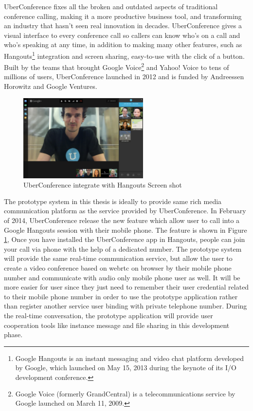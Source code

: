 \par UberConference fixes all the broken and outdated aspects of traditional conference calling, making it a more productive business tool, and transforming an industry that hasn't seen real innovation in decades. UberConference gives a visual interface to every conference call so callers can know who's on a call and who's speaking at any time, in addition to making many other features, such as Hangouts\footnote{Google Hangouts is an instant messaging and video chat platform developed by Google, which launched on May 15, 2013 during the keynote of its I/O development conference.\cite{wiki:hangouts}} integration and screen sharing, easy-to-use with the click of a button. Built by the teams that brought Google Voice\footnote{Google Voice (formerly GrandCentral) is a telecommunications service by Google launched on March 11, 2009.\cite{wiki:googleVoice}} and Yahoo! Voice to tens of millions of users, UberConference launched in 2012 and is funded by Andreessen Horowitz and Google Ventures.\cite{web:uberconference}

\begin{figure}
	\centering
    	\includegraphics[width=0.58\textwidth,natwidth=610,natheight=642]{figs/uberconference_hangout.jpg}
  	\caption{UberConference integrate with Hangouts Screen shot\cite{tnw:uberconference}}
  	\label{fig:uberconference}
\end{figure}

\par The prototype system in this thesis is ideally to provide same rich media communication platform as the service provided by UberConference. In February of 2014, UberConference release the new feature which allow user to call into a Google Hangouts session with their mobile phone. The feature is shown in Figure \ref{fig:uberconference}, Once you have installed the UberConference app in Hangouts, people can join your call via phone with the help of a dedicated number. The prototype system will provide the same real-time communication service, but allow the user to create a video conference based on \gls{webrtc} on browser by their mobile phone number and communicate with audio only mobile phone user as well. It will be more easier for user since they just need to remember their user credential related to their mobile phone number in order to use the prototype application rather than register another service user binding with private telephone number. During the real-time conversation, the prototype application will provide user cooperation tools like instance message and file sharing in this development phase.

